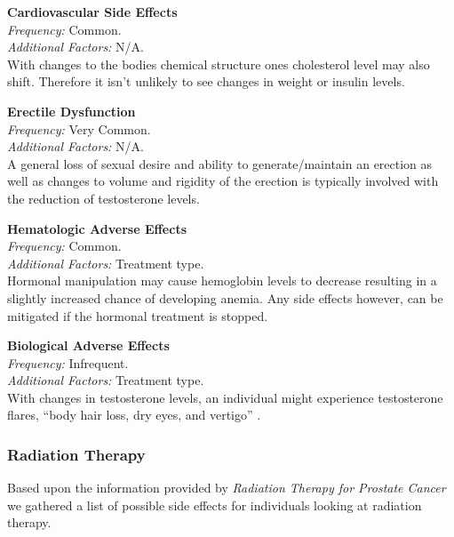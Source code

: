 \documentclass[journal]{vgtc}                %
\begin{document}
                        \textbf{Cardiovascular Side Effects}
                        \\ \textit{Frequency:} Common.
                        \\ \textit{Additional Factors:} N/A.
                        \\ With changes to the bodies chemical structure ones cholesterol level may also shift.
                        Therefore it isn't unlikely to see changes in weight or insulin levels. \cite{AdverseEvents:2005}
                        \newline

                        \textbf{Erectile Dysfunction}
                        \\ \textit{Frequency:} Very Common.
                        \\ \textit{Additional Factors:} N/A.
                        \\ A general loss of sexual desire and ability to generate/maintain an erection as well as changes to volume and rigidity of the erection is typically involved with the reduction of testosterone levels.
                        \newline

                        \textbf{Hematologic Adverse Effects}
                        \\ \textit{Frequency:} Common.
                        \\ \textit{Additional Factors:} Treatment type.
                        \\ Hormonal manipulation may cause hemoglobin levels to decrease resulting in a slightly increased chance of developing anemia. Any side effects however, can be mitigated if the hormonal treatment is stopped. \cite{AdverseEvents:2005}
                        \newline

                        \textbf{Biological Adverse Effects}
                        \\ \textit{Frequency:} Infrequent.
                        \\ \textit{Additional Factors:} Treatment type.
                        \\ With changes in testosterone levels, an individual might experience testosterone flares, ``body hair loss, dry eyes, and vertigo'' \cite{AdverseEvents:2005}.

                \subsubsection{Radiation Therapy}
                        Based upon the information provided by \textit{Radiation Therapy for Prostate Cancer}\cite{RadiationTherapy:2005} we gathered a list of possible side effects for individuals looking at radiation therapy.
\end{document}
